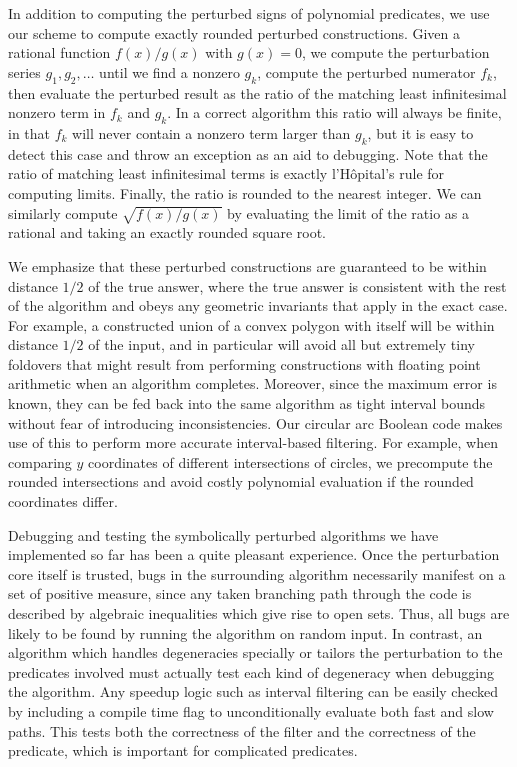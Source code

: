 \documentclass[11pt]{article}
\begin{document}
In addition to computing the perturbed signs of polynomial predicates, we use our scheme to compute exactly rounded perturbed constructions.  Given a rational function $f(x)/g(x)$
with $g(x) = 0$, we compute the perturbation series $g_1, g_2, \ldots$ until we find a nonzero $g_k$, compute the perturbed numerator $f_k$, then evaluate the perturbed result as
the ratio of the matching least infinitesimal nonzero term in $f_k$ and $g_k$.  In a correct algorithm this ratio will always be finite, in that $f_k$ will never contain a nonzero term
larger than $g_k$, but it is easy to detect this case and throw an exception as an aid to debugging.  Note that the ratio of matching least infinitesimal terms is exactly l'H\^opital's
rule for computing limits.  Finally, the ratio is rounded to the nearest integer.  We can similarly compute $\sqrt{f(x)/g(x)}$ by evaluating the limit of the ratio as a rational and
taking an exactly rounded square root.

We emphasize that these perturbed constructions are guaranteed to be within distance $1/2$ of the true answer, where the true answer is consistent with the rest of the algorithm and
obeys any geometric invariants that apply in the exact case.  For example, a constructed union of a convex polygon with itself will be within distance $1/2$ of the input, and in
particular will avoid all but extremely tiny foldovers that might result from performing constructions with floating point arithmetic when an algorithm completes.
Moreover, since the maximum error is known, they can be fed back into the same algorithm as tight interval bounds without fear of introducing inconsistencies.  Our
circular arc Boolean code makes use of this to perform more accurate interval-based filtering.  For example, when comparing $y$ coordinates of different intersections of circles,
we precompute the rounded intersections and avoid costly polynomial evaluation if the rounded coordinates differ.

Debugging and testing the symbolically perturbed algorithms we have implemented so far has been a quite pleasant experience.  Once the perturbation core itself is trusted,
bugs in the surrounding algorithm necessarily manifest on a set of positive measure, since any taken branching path through the code is described by algebraic inequalities which
give rise to open sets.  Thus, all bugs are likely to be found by running the algorithm on random input.  In contrast, an
algorithm which handles degeneracies specially or tailors the perturbation to the predicates involved must actually test each kind of degeneracy when debugging the algorithm.
Any speedup logic such as interval filtering can be easily checked by including a compile time flag to unconditionally evaluate both fast and slow paths.  This tests both the
correctness of the filter and the correctness of the predicate, which is important for complicated predicates.
\end{document}
